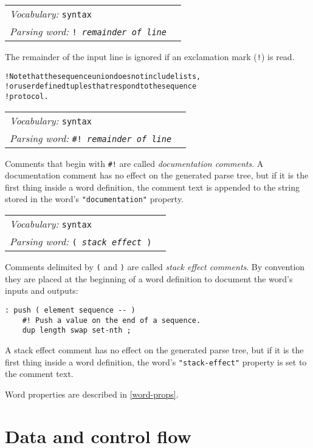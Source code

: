 \documentclass{book}
\newcommand{\vocabulary}[1]{\emph{Vocabulary:} \texttt{#1}&\\}
\newcommand{\parsingword}[2]{\index{\texttt{#1}}\emph{Parsing word:} \texttt{#2}&\\}
\newcommand{\wordtable}[1]{

\begin{tabularx}{12cm}[t]{lX}
\hline
#1
\hline
\end{tabularx}

}
\begin{document}
\wordtable{
\vocabulary{syntax}
\parsingword{!}{!~\emph{remainder of line}}
}
The remainder of the input line is ignored if an exclamation mark (\texttt{!}) is read.
\begin{alltt}
! Note that the sequence union does not include lists,
! or user defined tuples that respond to the sequence
! protocol.
\end{alltt}
\wordtable{
\vocabulary{syntax}
\parsingword{hash!}{\#!~\emph{remainder of line}}
}
\newcommand{\doccommentglos}{}
\doccommentglos
Comments that begin with \texttt{\#!} are called \emph{documentation comments}.
A documentation comment has no effect on the generated parse tree, but if it is the first thing inside a word definition, the comment text is appended to the string stored in the word's \texttt{"documentation"} property. 
\wordtable{
\vocabulary{syntax}
\parsingword{(}{( \emph{stack effect} )}
}
\newcommand{\stackcommentglos}{}
\stackcommentglos
Comments delimited by \texttt{(} and \texttt{)} are called \emph{stack effect comments}. By convention they are placed at the beginning of a word definition to document the word's inputs and outputs:
\begin{verbatim}
: push ( element sequence -- )
    #! Push a value on the end of a sequence.
    dup length swap set-nth ;
\end{verbatim}
A stack effect comment has no effect on the generated parse tree, but if it is the first thing inside a word definition, the word's \texttt{"stack-effect"} property is set to the comment text.

Word properties are described in \ref{word-props}.

\section{Data and control flow}
\end{document}

